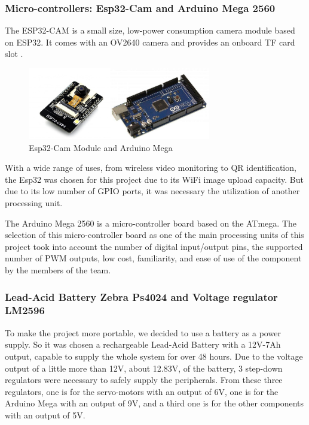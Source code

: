 \documentclass[a4paper,11pt]{article}
\begin{document}
\subsubsection{Micro-controllers: Esp32-Cam and Arduino Mega 2560}
\label{subsubsec:esp32}
The ESP32-CAM is a small size, low-power consumption camera module based on ESP32. It comes with an OV2640 camera and provides an onboard TF card slot \cite{evelta}.

\begin{figure}[H]
  \centering
  \includegraphics[width=8cm]{Figures/Micros.png}
  \caption{\small{Esp32-Cam Module and Arduino Mega}}
  \label{fig:Esp32}
\end{figure}

With a wide range of uses, from wireless video monitoring to QR identification, the Esp32 was chosen for this project due to its WiFi image upload capacity. But due to its low number of GPIO ports, it was necessary the utilization of another processing unit.

The Arduino Mega 2560 is a micro-controller board based on the ATmega. The selection of this micro-controller board as one of the main processing units of this project took into account the number of digital input/output pins, the supported number of PWM outputs, low cost, familiarity, and ease of use of the component by the members of the team\cite{arduino}.

\subsubsection{Lead-Acid Battery Zebra Ps4024 and Voltage regulator LM2596}
\label{subsubsec:battery}
To make the project more portable, we decided to use a battery as a power supply. So it was chosen a rechargeable Lead-Acid Battery with a 12V-7Ah output, capable to supply the whole system for over 48 hours. Due to the voltage output of a little more than 12V, about 12.83V, of the battery, 3 step-down regulators were necessary to safely supply the peripherals. From these three regulators, one is for the servo-motors with an output of 6V, one is for the Arduino Mega with an output of 9V, and a third one is for the other components with an output of 5V.
\end{document}
